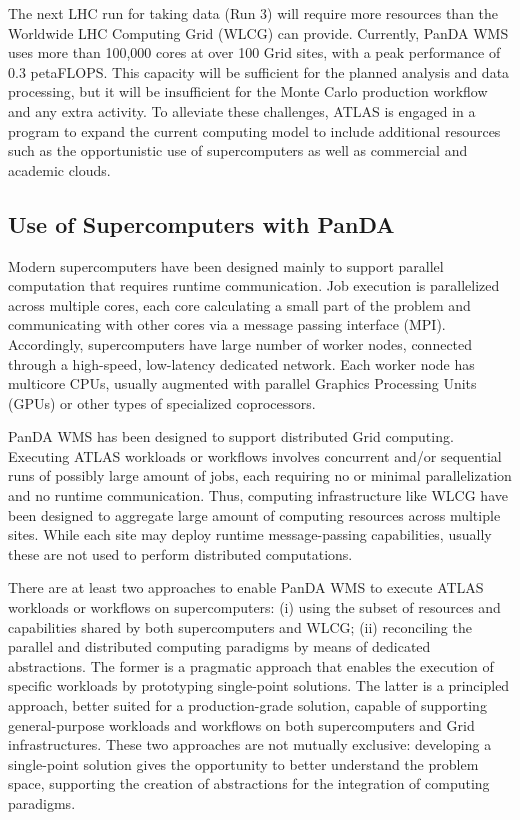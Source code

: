 The next LHC run for taking data (Run 3) will require more resources than the
Worldwide LHC Computing Grid (WLCG) can provide. Currently, PanDA WMS uses more
than 100,000 cores at over 100 Grid sites, with a peak performance of 0.3
petaFLOPS. This capacity will be sufficient for the planned analysis and data
processing, but it will be insufficient for the Monte Carlo production workflow
and any extra activity. To alleviate these challenges, ATLAS is engaged in a
program to expand the current computing model to include additional resources
such as the opportunistic use of supercomputers as well as commercial and
academic clouds.


\subsection{Use of Supercomputers with PanDA}
\label{ssec:panda-supercomputers}

Modern supercomputers have been designed mainly to support parallel computation
that requires runtime communication. Job execution is parallelized across
multiple cores, each core calculating a small part of the problem and
communicating with other cores via a message passing interface (MPI).
Accordingly, supercomputers have large number of worker nodes, connected through
a high-speed, low-latency dedicated network. Each worker node has multicore
CPUs, usually augmented with parallel Graphics Processing Units (GPUs) or other
types of specialized coprocessors.


PanDA WMS has been designed to support distributed Grid computing. Executing
ATLAS workloads or workflows involves concurrent and/or sequential runs of
possibly large amount of jobs, each requiring no or minimal parallelization and
no runtime communication. Thus, computing infrastructure like WLCG have been
designed to aggregate large amount of computing resources across multiple sites.
While each site may deploy runtime message-passing capabilities, usually these
are not used to perform distributed computations.

There are at least two approaches to enable PanDA WMS to execute ATLAS workloads
or workflows on supercomputers: (i) using the subset of resources and
capabilities shared by both supercomputers and WLCG; (ii) reconciling the
parallel and distributed computing paradigms by means of dedicated abstractions.
The former is a pragmatic approach that enables the execution of specific
workloads by prototyping single-point solutions. The latter is a principled
approach, better suited for a production-grade solution, capable of supporting
general-purpose workloads and workflows on both supercomputers and Grid
infrastructures. These two approaches are not mutually exclusive: developing a
single-point solution gives the opportunity to better understand the problem
space, supporting the creation of abstractions for the integration of computing
paradigms.

